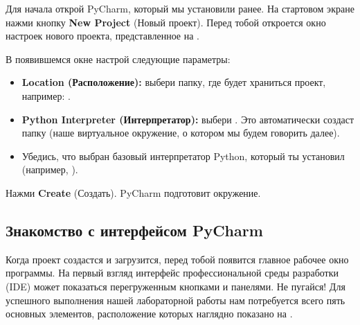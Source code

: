 Для начала открой PyCharm, который мы установили ранее. На стартовом экране нажми кнопку \textbf{New Project} (Новый проект). Перед тобой откроется окно настроек нового проекта, представленное на .


В появившемся окне настрой следующие параметры:
\begin{itemize}
    \item \textbf{Location (Расположение):} выбери папку, где будет храниться проект, например: .
    \item \textbf{Python Interpreter (Интерпретатор):} выбери . Это автоматически создаст папку  (наше виртуальное окружение, о котором мы будем говорить далее).
    \item Убедись, что выбран базовый интерпретатор Python, который ты установил (например, ).
\end{itemize}


Нажми \textbf{Create} (Создать). PyCharm подготовит окружение.

\subsection{Знакомство с интерфейсом PyCharm}

Когда проект создастся и загрузится, перед тобой появится главное рабочее окно программы. На первый взгляд интерфейс профессиональной среды разработки (IDE) может показаться перегруженным кнопками и панелями. Не пугайся! Для успешного выполнения нашей лабораторной работы нам потребуется всего пять основных элементов, расположение которых наглядно показано на .

